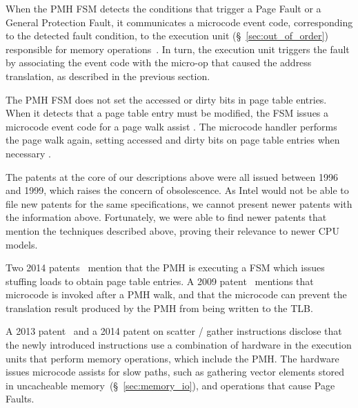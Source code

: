 When the PMH FSM detects the conditions that trigger a Page Fault or a General
Protection Fault, it communicates a microcode event code, corresponding to the
detected fault condition, to the execution unit (\S~\ref{sec:out_of_order})
responsible for memory operations~\cite{intel1996dtlb, intel1997pmh,
intel1999exceptions, intel1999events}. In turn, the execution unit triggers the
fault by associating the event code with the micro-op that caused the address
translation, as described in the previous section.

The PMH FSM does not set the accessed or dirty bits in page table entries. When
it detects that a page table entry must be modified, the FSM issues a microcode
event code for a page walk assist \cite{intel1997pmh}. The microcode handler
performs the page walk again, setting accessed and dirty bits on page table
entries when necessary \cite{intel1997pmh}.

The patents at the core of our descriptions above \cite{intel1996dtlb,
intel1997events, intel1997pmh, intel1999exceptions, intel1999events} were all
issued between 1996 and 1999, which raises the concern of obsolescence. As
Intel would not be able to file new patents for the same specifications, we
cannot present newer patents with the information above. Fortunately, we were
able to find newer patents that mention the techniques described above,
proving their relevance to newer CPU models.


Two 2014 patents~\cite{hildesheim2014ptm, raikin2014tlb} mention that the PMH
is executing a FSM which issues stuffing loads to obtain page table entries.
A 2009 patent~\cite{intel2009pipeline} mentions that microcode is invoked after
a PMH walk, and that the microcode can prevent the translation result produced
by the PMH from being written to the TLB.


A 2013 patent~\cite{intel2013scattergather} and a 2014 patent
\cite{intel2014gather} on scatter / gather instructions disclose that the newly
introduced instructions use a combination of hardware in the execution units
that perform memory operations, which include the PMH. The hardware issues
microcode assists for slow paths, such as gathering vector elements stored in
uncacheable memory~(\S~\ref{sec:memory_io}), and operations that cause Page
Faults.

